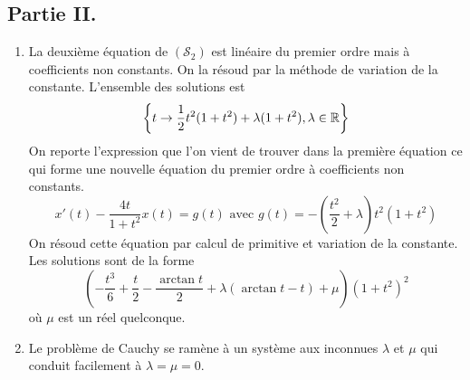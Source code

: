 \subsection*{Partie II.}
\begin{enumerate}
 \item La deuxième équation de $(\mathcal{S}_2)$ est linéaire du premier ordre mais à coefficients non constants. On la résoud par la méthode de variation de la constante. L'ensemble des solutions est
\begin{displaymath}
 \left\lbrace
t\rightarrow \frac{1}{2}t^2(1+t^2) + \lambda (1+t^2), \lambda \in \mathbb{R}
 \right\rbrace 
\end{displaymath}
On reporte l'expression que l'on vient de trouver dans la première équation ce qui forme une nouvelle équation du premier ordre à coefficients non constants.
\begin{displaymath}
 x'(t)-\frac{4t}{1+t^2}x(t)=g(t) \text{ avec }
g(t)= -(\frac{t^2}{2}+\lambda)t^2(1+t^2)
\end{displaymath}
On résoud cette équation par calcul de primitive et variation de la constante. Les solutions sont de la forme
\begin{displaymath}
 \left(
-\frac{t^3}{6}+\frac{t}{2}-\frac{\arctan t}{2} +\lambda(\arctan t -t) + \mu
 \right) (1+t^2)^2
\end{displaymath}
où $\mu$ est un réel quelconque.
 \item Le problème de Cauchy se ramène à un système aux inconnues $\lambda$ et $\mu$ qui conduit facilement à $\lambda= \mu=0$.
\end{enumerate}

